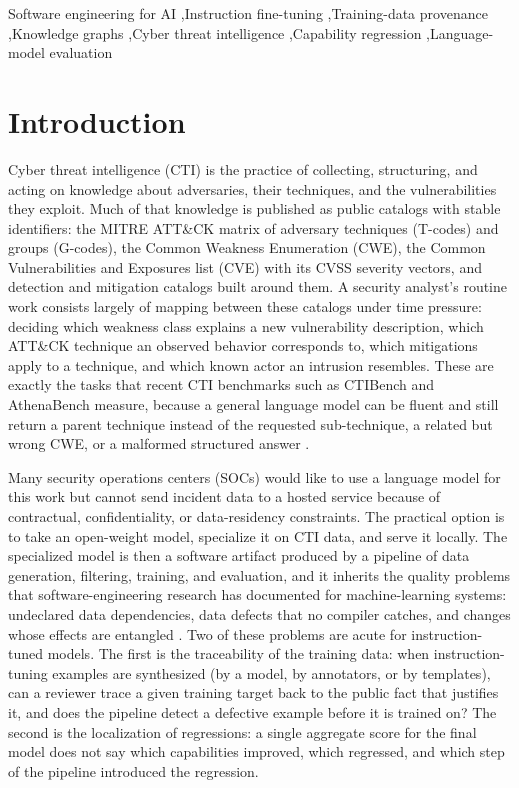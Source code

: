 \documentclass[a4paper,fleqn]{cas-dc}
\begin{document}
\begin{keywords}
Software engineering for AI \sep Instruction fine-tuning \sep Training-data provenance \sep Knowledge graphs \sep Cyber threat intelligence \sep Capability regression \sep Language-model evaluation
\end{keywords}

\maketitle

\section{Introduction}\label{sec:intro}
Cyber threat intelligence (CTI) is the practice of collecting, structuring, and acting on knowledge about adversaries, their techniques, and the vulnerabilities they exploit. Much of that knowledge is published as public catalogs with stable identifiers: the MITRE ATT\&CK matrix of adversary techniques (T-codes) and groups (G-codes), the Common Weakness Enumeration (CWE), the Common Vulnerabilities and Exposures list (CVE) with its CVSS severity vectors, and detection and mitigation catalogs built around them. A security analyst's routine work consists largely of mapping between these catalogs under time pressure: deciding which weakness class explains a new vulnerability description, which ATT\&CK technique an observed behavior corresponds to, which mitigations apply to a technique, and which known actor an intrusion resembles. These are exactly the tasks that recent CTI benchmarks such as CTIBench and AthenaBench measure, because a general language model can be fluent and still return a parent technique instead of the requested sub-technique, a related but wrong CWE, or a malformed structured answer \citep{alam2024ctibench,alam2025athenabench}.

Many security operations centers (SOCs) would like to use a language model for this work but cannot send incident data to a hosted service because of contractual, confidentiality, or data-residency constraints. The practical option is to take an open-weight model, specialize it on CTI data, and serve it locally. The specialized model is then a software artifact produced by a pipeline of data generation, filtering, training, and evaluation, and it inherits the quality problems that software-engineering research has documented for machine-learning systems: undeclared data dependencies, data defects that no compiler catches, and changes whose effects are entangled \citep{sculley2015hidden,amershi2019se4ml,martinez2022se4ai}. Two of these problems are acute for instruction-tuned models. The first is the traceability of the training data: when instruction-tuning examples are synthesized (by a model, by annotators, or by templates), can a reviewer trace a given training target back to the public fact that justifies it, and does the pipeline detect a defective example before it is trained on? The second is the localization of regressions: a single aggregate score for the final model does not say which capabilities improved, which regressed, and which step of the pipeline introduced the regression.
\end{document}
